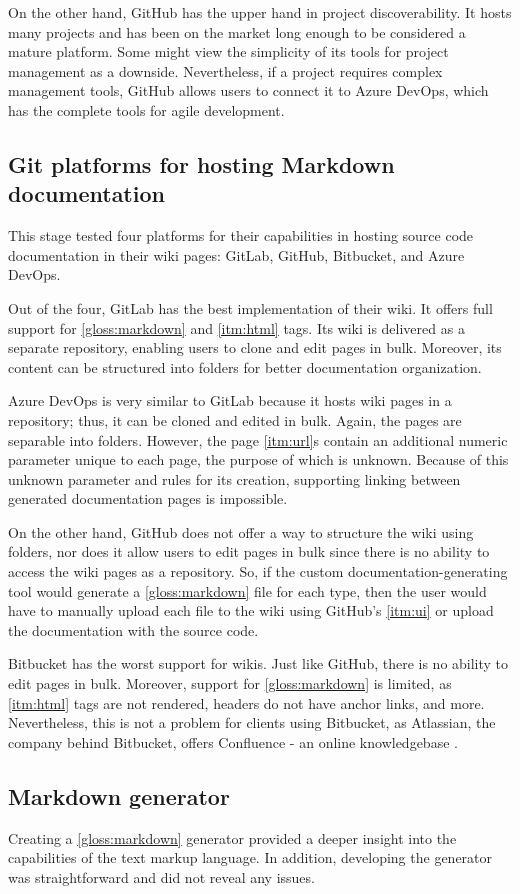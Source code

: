 On the other hand, GitHub has the upper hand in project discoverability. It hosts many projects and has been on the market long enough to be considered a mature platform. Some might view the simplicity of its tools for project management as a downside. Nevertheless, if a project requires complex management tools, GitHub allows users to connect it to Azure DevOps, which has the complete tools for agile development.

\subsection{Git platforms for hosting Markdown documentation}

This stage tested four platforms for their capabilities in hosting source code documentation in their wiki pages: GitLab, GitHub, Bitbucket, and Azure DevOps.

Out of the four, GitLab has the best implementation of their wiki. It offers full support for \ref{gloss:markdown} and \ref{itm:html} tags.
Its wiki is delivered as a separate repository, enabling users to clone and edit pages in bulk. Moreover, its content can be structured into folders for better documentation organization.

Azure DevOps is very similar to GitLab because it hosts wiki pages in a repository; thus, it can be cloned and edited in bulk. Again, the pages are separable into folders. However, the page \ref{itm:url}s contain an additional numeric parameter unique to each page, the purpose of which is unknown. Because of this unknown parameter and rules for its creation, supporting linking between generated documentation pages is impossible.

On the other hand, GitHub does not offer a way to structure the wiki using folders, nor does it allow users to edit pages in bulk since there is no ability to access the wiki pages as a repository. So, if the custom documentation-generating tool would generate a \ref{gloss:markdown} file for each type, then the user would have to manually upload each file to the wiki using GitHub's \ref{itm:ui} or upload the documentation with the source code.

Bitbucket has the worst support for wikis.
Just like GitHub, there is no ability to edit pages in bulk.
Moreover, support for \ref{gloss:markdown} is limited, as \ref{itm:html} tags are not rendered, headers do not have anchor links, and more.
Nevertheless, this is not a problem for clients using Bitbucket, as Atlassian, the company behind Bitbucket, offers Confluence - an online knowledgebase \cite{atlassian_confluence_nodate}.

\subsection{Markdown generator}

Creating a \ref{gloss:markdown} generator provided a deeper insight into the capabilities of the text markup language. In addition, developing the generator was straightforward and did not reveal any issues.
